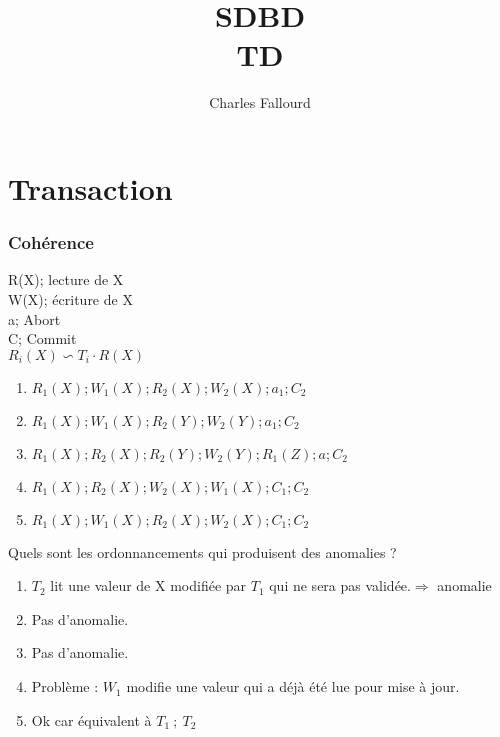 \documentclass[10pt,a4paper]{article}
\title{SDBD\\TD}
\date{}
\author{Charles Fallourd}
\begin{document}
\maketitle
\part*{Transaction}
\section*{Cohérence}
R(X); lecture de X \\
W(X); écriture de X \\
a; Abort \\
C; Commit \\
$R_i(X) \backsim T_i \cdot R(X)$ \\
\begin{enumerate}
\item $R_1(X); W_1(X); R_2(X); W_2(X); a_1; C_2$
\item $R_1(X); W_1(X); R_2(Y); W_2(Y); a_1; C_2$
\item $R_1(X); R_2(X); R_2(Y); W_2(Y); R_1(Z); a; C_2$
\item $R_1(X); R_2(X); W_2(X); W_1(X); C_1; C_2$
\item $R_1(X); W_1(X); R_2(X); W_2(X);  C_1; C_2$
\end{enumerate}
\vspace{1cm}
Quels sont les ordonnancements qui produisent des anomalies ?
\vspace{1cm}
\begin{enumerate}
\item $T_2$ lit une valeur de X modifiée par $T_1$ qui ne sera pas validée.$\Rightarrow$ anomalie
\item Pas d'anomalie.
\item Pas d'anomalie.
\item Problème : $W_1$ modifie une valeur qui a déjà été lue pour mise à jour.
\item Ok car équivalent à $T_1\ ;\ T_2$
\end{enumerate}
\vspace{1cm}
\end{document}
